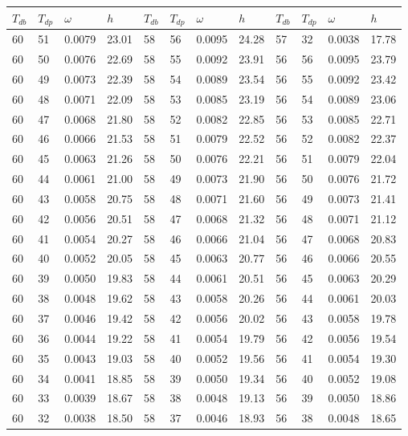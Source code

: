 \begin{tabular}{llll|llll|llll}
 \toprule 
\(T_{db}\) & \(T_{dp}\) & \(\omega\) & \(h\) & \(T_{db}\) & \(T_{dp}\) & \(\omega\) & \(h\) & \(T_{db}\) & \(T_{dp}\) & \(\omega\) & \(h\)  \\ \midrule 
60 & 51 & 0.0079 & 23.01 & 58 & 56 & 0.0095 & 24.28 & 57 & 32 & 0.0038 & 17.78\\
60 & 50 & 0.0076 & 22.69 & 58 & 55 & 0.0092 & 23.91 & 56 & 56 & 0.0095 & 23.79\\
60 & 49 & 0.0073 & 22.39 & 58 & 54 & 0.0089 & 23.54 & 56 & 55 & 0.0092 & 23.42\\
60 & 48 & 0.0071 & 22.09 & 58 & 53 & 0.0085 & 23.19 & 56 & 54 & 0.0089 & 23.06\\
60 & 47 & 0.0068 & 21.80 & 58 & 52 & 0.0082 & 22.85 & 56 & 53 & 0.0085 & 22.71\\
60 & 46 & 0.0066 & 21.53 & 58 & 51 & 0.0079 & 22.52 & 56 & 52 & 0.0082 & 22.37\\
60 & 45 & 0.0063 & 21.26 & 58 & 50 & 0.0076 & 22.21 & 56 & 51 & 0.0079 & 22.04\\
60 & 44 & 0.0061 & 21.00 & 58 & 49 & 0.0073 & 21.90 & 56 & 50 & 0.0076 & 21.72\\
60 & 43 & 0.0058 & 20.75 & 58 & 48 & 0.0071 & 21.60 & 56 & 49 & 0.0073 & 21.41\\
60 & 42 & 0.0056 & 20.51 & 58 & 47 & 0.0068 & 21.32 & 56 & 48 & 0.0071 & 21.12\\
60 & 41 & 0.0054 & 20.27 & 58 & 46 & 0.0066 & 21.04 & 56 & 47 & 0.0068 & 20.83\\
60 & 40 & 0.0052 & 20.05 & 58 & 45 & 0.0063 & 20.77 & 56 & 46 & 0.0066 & 20.55\\
60 & 39 & 0.0050 & 19.83 & 58 & 44 & 0.0061 & 20.51 & 56 & 45 & 0.0063 & 20.29\\
60 & 38 & 0.0048 & 19.62 & 58 & 43 & 0.0058 & 20.26 & 56 & 44 & 0.0061 & 20.03\\
60 & 37 & 0.0046 & 19.42 & 58 & 42 & 0.0056 & 20.02 & 56 & 43 & 0.0058 & 19.78\\
60 & 36 & 0.0044 & 19.22 & 58 & 41 & 0.0054 & 19.79 & 56 & 42 & 0.0056 & 19.54\\
60 & 35 & 0.0043 & 19.03 & 58 & 40 & 0.0052 & 19.56 & 56 & 41 & 0.0054 & 19.30\\
60 & 34 & 0.0041 & 18.85 & 58 & 39 & 0.0050 & 19.34 & 56 & 40 & 0.0052 & 19.08\\
60 & 33 & 0.0039 & 18.67 & 58 & 38 & 0.0048 & 19.13 & 56 & 39 & 0.0050 & 18.86\\
60 & 32 & 0.0038 & 18.50 & 58 & 37 & 0.0046 & 18.93 & 56 & 38 & 0.0048 & 18.65\\

\end{tabular}
